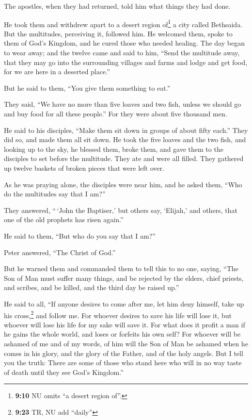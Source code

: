  The apostles, when they had returned, told him what
things they had done.

He took them and withdrew apart to a desert region of\footnote{\textbf{9:10}
  NU omits ``a desert region of''.} a city called Bethsaida.
 But the multitudes, perceiving it, followed him. He
welcomed them, spoke to them of God's Kingdom, and he cured those who
needed healing.  The day began to wear away; and the
twelve came and said to him, ``Send the multitude away, that they may go
into the surrounding villages and farms and lodge and get food, for we
are here in a deserted place.''

 But he said to them, ``You give them something to eat.''

They said, ``We have no more than five loaves and two fish, unless we
should go and buy food for all these people.''  For they
were about five thousand men.

He said to his disciples, ``Make them sit down in groups of about fifty
each.''  They did so, and made them all sit down.
 He took the five loaves and the two fish, and looking up
to the sky, he blessed them, broke them, and gave them to the disciples
to set before the multitude.  They ate and were all
filled. They gathered up twelve baskets of broken pieces that were left
over.

 As he was praying alone, the disciples were near him,
and he asked them, ``Who do the multitudes say that I am?''

 They answered, ``\,`John the Baptiser,' but others say,
`Elijah,' and others, that one of the old prophets has risen again.''

 He said to them, ``But who do you say that I am?''

Peter answered, ``The Christ of God.''

 But he warned them and commanded them to tell this to no
one,  saying, ``The Son of Man must suffer many things,
and be rejected by the elders, chief priests, and scribes, and be
killed, and the third day be raised up.''

 He said to all, ``If anyone desires to come after me,
let him deny himself, take up his cross,\footnote{\textbf{9:23} TR, NU
  add ``daily''} and follow me.  For whoever desires to
save his life will lose it, but whoever will lose his life for my sake
will save it.  For what does it profit a man if he gains
the whole world, and loses or forfeits his own self?  For
whoever will be ashamed of me and of my words, of him will the Son of
Man be ashamed when he comes in his glory, and the glory of the Father,
and of the holy angels.  But I tell you the truth: There
are some of those who stand here who will in no way taste of death until
they see God's Kingdom.''

